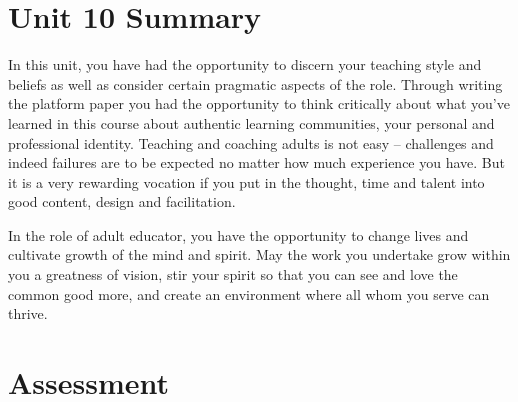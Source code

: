 \documentclass[
]{book}
\begin{document}
\hypertarget{unit-10-summary}{%
\section*{Unit 10 Summary}\label{unit-10-summary}}

In this unit, you have had the opportunity to discern your teaching style and beliefs as well as consider certain pragmatic aspects of the role. Through writing the platform paper you had the opportunity to think critically about what you've learned in this course about authentic learning communities, your personal and professional identity. Teaching and coaching adults is not easy -- challenges and indeed failures are to be expected no matter how much experience you have. But it is a very rewarding vocation if you put in the thought, time and talent into good content, design and facilitation.

In the role of adult educator, you have the opportunity to change lives and cultivate growth of the mind and spirit. May the work you undertake grow within you a greatness of vision, stir your spirit so that you can see and love the common good more, and create an environment where all whom you serve can thrive.

\hypertarget{assessment-9}{%
\section*{Assessment}\label{assessment-9}}
\end{document}
